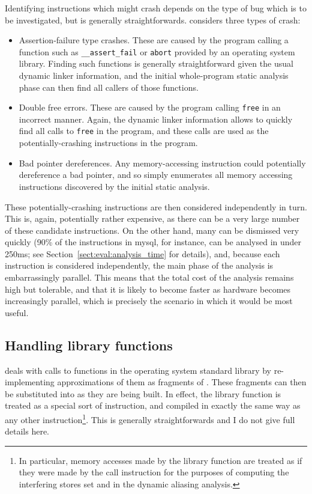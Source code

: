 Identifying instructions which might crash depends on the type of bug
which is to be investigated, but is generally straightforwards.
{\Implementation} considers three types of crash:

\begin{itemize}
\item Assertion-failure type crashes.  These are caused by the program
  calling a function such as \verb|__assert_fail| or \verb|abort|
  provided by an operating system library.  Finding such functions is
  generally straightforward given the usual dynamic linker
  information, and the initial whole-program static analysis phase can
  then find all callers of those functions.
\item Double free errors.  These are caused by the program calling
  \verb|free| in an incorrect manner.  Again, the dynamic linker
  information allows {\implementation} to quickly find all calls to
  \verb|free| in the program, and these calls are used as the
  potentially-crashing instructions in the program.
\item Bad pointer dereferences.  Any memory-accessing instruction
  could potentially dereference a bad pointer, and so
  {\implementation} simply enumerates all memory accessing
  instructions discovered by the initial static analysis.
\end{itemize}

These potentially-crashing instructions are then considered
independently in turn.  This is, again, potentially rather expensive,
as there can be a very large number of these candidate instructions.
On the other hand, many can be dismissed very quickly (90\% of the
instructions in mysql, for instance, can be analysed in under 250ms;
see Section~\ref{sect:eval:analysis_time} for details), and, because
each instruction is considered independently, the main phase of the
analysis is embarrassingly parallel.  This means that the total cost
of the analysis remains high but tolerable, and that it is likely to
become faster as hardware becomes increasingly parallel, which is
precisely the scenario in which it would be most useful.

\subsection{Handling library functions}
\label{sect:derive:library_functions}

{\Implementation} deals with calls to functions in the operating
system standard library by re-implementing approximations of them as
fragments of {\StateMachine}.  These fragments can then be substituted
into {\StateMachines} as they are being built.  In effect, the library
function is treated as a special sort of instruction, and compiled in
exactly the same way as any other instruction\footnote{In particular,
  memory accesses made by the library function are treated as if they
  were made by the call instruction for the purposes of computing the
  interfering stores set and in the dynamic aliasing analysis.}.  This
is generally straightforwards and I do not give full details here.

